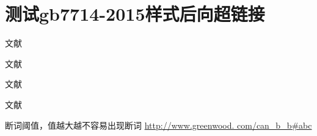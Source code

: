 \documentclass{article}
\begin{document}
    \section{测试gb7714-2015样式后向超链接}


	文献\cite{greenwood1988}

    \newpage

    文献\cite{greenwood1992}

    \newpage

    文献\cite{greenwood1993}

    \newpage

    文献\cite{刘凤良2017}

    \newpage
    \nocite{*}
    断词阈值，值越大越不容易出现断词
    \href{http://www.greenwood.com/can_b_b#abc}{http://www.greenwood. com/can\_b\_b\#abc}

    {

    \printbibliography

    }

    
\end{document}
